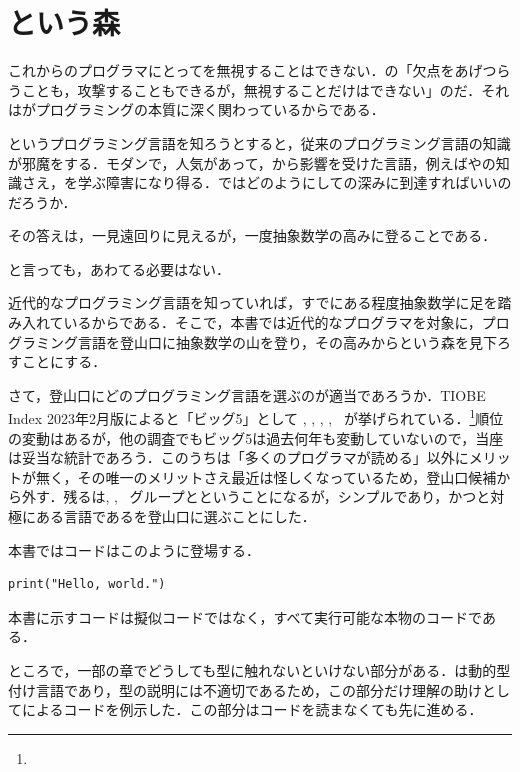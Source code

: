 \documentclass[a5paper,twoside,fleqn,draft]{jsbook}
\begin{document}
\section{\haskell という森}

これからのプログラマにとって\haskell を無視することはできない．\haskell の「欠点をあげつらうことも，攻撃することもできるが，無視することだけはできない」のだ．それは\haskell がプログラミングの本質に深く関わっているからである．

\haskell というプログラミング言語を知ろうとすると，従来のプログラミング言語の知識が邪魔をする．モダンで，人気があって，\haskell から影響を受けた言語，例えば\ruby や\swift の知識さえ，\haskell を学ぶ障害になり得る．ではどのようにして\haskell の深みに到達すればいいのだろうか．

その答えは，一見遠回りに見えるが，一度抽象数学の高みに登ることである．

と言っても，あわてる必要はない．

近代的なプログラミング言語を知っていれば，すでにある程度抽象数学に足を踏み入れているからである．そこで，本書では近代的なプログラマを対象に，プログラミング言語を登山口に抽象数学の山を登り，その高みから\haskell という森を見下ろすことにする．


さて，登山口にどのプログラミング言語を選ぶのが適当であろうか．TIOBE Index 2023年2月版によると「ビッグ5」として \python, \clang, \cxx, \java, \csharp\ が挙げられている．\footnote{}順位の変動はあるが，他の調査でもビッグ5は過去何年も変動していないので，当座は妥当な統計であろう．このうち\clang は「多くのプログラマが読める」以外にメリットが無く，その唯一のメリットさえ最近は怪しくなっているため，登山口候補から外す．残るは\java, \cxx, \csharp\ グループと\python ということになるが，シンプルであり，かつ\haskell と対極にある言語である\python を登山口に選ぶことにした．

本書では\python コードはこのように登場する．
\begin{pythoncode}
\begin{verbatim}
print("Hello, world.")
\end{verbatim}
\end{pythoncode}
本書に示すコードは擬似コードではなく，すべて実行可能な本物のコードである．

ところで，一部の章でどうしても型に触れないといけない部分がある．\python は動的型付け言語であり，型の説明には不適切であるため，この部分だけ理解の助けとして\cxxseventeen によるコードを例示した．この部分はコードを読まなくても先に進める．
\end{document}
